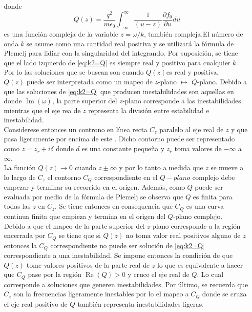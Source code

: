 \documentclass[../tesis_main_file.tex]{subfile}
\begin{document}
donde
\begin{equation}
\label{eq:Q(z)_integral}
Q(z) = \frac{q^2}{m \epsilon _0}\int^{\infty}_{-\infty} \frac{1}{(u -z)}\frac{\partial f_0}{\partial u}du
\end{equation}
es una función compleja de la variable $z=\omega /k$, también compleja.El número de onda $k$ se asume como una cantidad real positiva y se utilizará la fórmula de Plemelj para lidiar con la singularidad del integrando.
Por suposición, se tiene que el lado izquierdo de \ref{eq:k2=Q} es siempre real y positivo para cualquier $k$. Por lo las soluciones que se buscan son cuando $Q(z)$es real y positiva.\\
$Q(z)$  puede ser interpretada como un mapeo de $z$-plano $\mapsto$ $Q$-plano. Debido a que las soluciones de \ref{eq:k2=Q} que producen inestabilidades son aquellas en donde $\operatorname{Im}(\omega)$, la parte superior del $z$-plano corresponde a las inestabilidades mientras que el eje rea de $z$ representa la división entre estabilidad e inestabilidad.\\
Considerese entonces un controno en línea recta $C_z$ paralelo al eje real de $z$ y que pasa ligeramente por encima de este .
Dicho contorno puede ser representado como $z=z_r + i\delta$ donde $d$ es una constante pequeña y $z_r$ toma valores de $-\infty$ a $\infty$.\\
La función $Q(z) \to 0$ cuando $z \pm \infty$ y por lo tanto a medida que $z$ se mueve a lo largo de $C_z$  el contorno $C_Q$ correspondiente en el $Q-plano$ complejo debe empezar y terminar su recorrido en el origen.
Además, como $Q$ puede ser evaluada por medio de la fórmula de Plemelj se observa que $Q$ es finita para todas las $z$ en $C_z$.
Se tiene entonces en consequencia que $C_Q$ es una curva continua finita que empieza y termina en el origen del $Q$-plano complejo.\\
Debido a que el mapeo de la parte superior del $z$-plano corresponde a la región encerrada por $C_Q$ se tiene que si $Q(z)$ no toma valor real positivos alguno de $z$ entonces  la $C_Q$ correspondiente no puede ser solución de \ref{eq:k2=Q} correspondiente a una inestabilidad. 
Se impone entonces la condición de que $Q(z)$ tome valores positivos de la parte real de $z$ lo que es equivalente a hacer que $C_Q$ pase por la región $\operatorname{Re}(Q) >0$ y cruce el eje real de $Q$.
Lo cual corresponde a soluciones que generen inestabilidades.
Por último, se recuerda que $C_z$ son la frecuencias ligeramente inestables por lo el mapeo a $C_Q$ donde se cruza el eje real positivo de $Q$ también representa inestabilidades ligeras.\\
\end{document}
